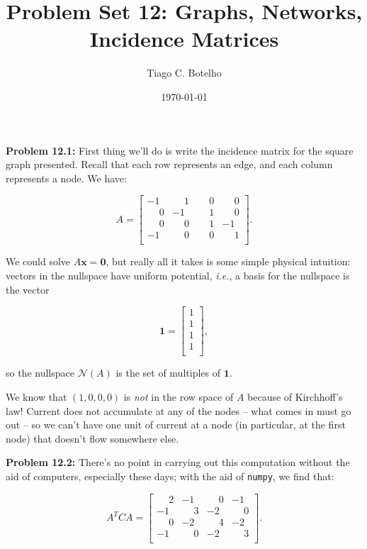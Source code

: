 \documentclass{article}
\title{Problem Set 12: Graphs, Networks, Incidence Matrices}
\author{Tiago C. Botelho}
\date{\today}
\begin{document}
\maketitle

\noindent \textbf{Problem 12.1:} First thing we'll do is write the incidence matrix for the square graph presented. Recall that each row represents an edge, and each column represents a node. We have:

\[
A = \begin{bmatrix}
-1 & \phantom{-}1 & \phantom{-}0 & \phantom{-}0\\
\phantom{-}0 & -1 & \phantom{-}1 & \phantom{-}0\\
\phantom{-}0 & \phantom{-}0 & \phantom{-}1 & -1\\
-1 & \phantom{-}0 & \phantom{-}0 & \phantom{-}1\\
\end{bmatrix}.
\]

We could solve $A\mathbf{x = 0}$, but really all it takes is some simple physical intuition: vectors in the nullspace have uniform potential, \textit{i.e.}, a basis for the nullspace is the vector

\[
\mathbf{1} = \begin{bmatrix}
1\\
1\\
1\\
1\\
\end{bmatrix},
\]

so the nullspace $\mathcal{N}(A)$ is the set of multiples of $\mathbf{1}$.

We know that $(1, 0, 0, 0)$ is \textit{not} in the row space of $A$ because of Kirchhoff's law! Current does not accumulate at any of the nodes -- what comes in must go out -- so we can't have one unit of current at a node (in particular, at the first node) that doesn't flow somewhere else.

\noindent \textbf{Problem 12.2:} There's no point in carrying out this computation without the aid of computers, especially these days; with the aid of \texttt{numpy}, we find that:

\[
A^{T}CA = \begin{bmatrix}
\phantom{-}2 & -1 & \phantom{-}0 & -1\\
-1 & \phantom{-}3 & -2 & \phantom{-}0\\
\phantom{-}0 & -2 & \phantom{-}4 & -2\\
-1 & \phantom{-}0 & -2 & \phantom{-}3\\
\end{bmatrix}.
\]
\end{document}
